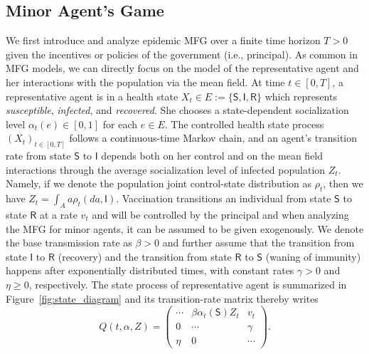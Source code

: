 \documentclass[letterpaper, 10 pt, conference]{ieeeconf}  %
\def\sS{\mathsf{S}}
\def\sI{\mathsf{I}}
\def\sR{\mathsf{R}}
\begin{document}
\subsection{Minor Agent's Game}
We first introduce and analyze epidemic MFG over a finite time horizon $T>0$ given the incentives or policies of the government (i.e., principal). As common in MFG models, we can directly focus on the model of the representative agent and her interactions with the population via the mean field. At time $t \in[0, T]$, a representative agent is in a health state $X_t \in E:=\{\sS, \sI, \sR\}$ which represents \textit{susceptible}, \textit{infected}, and \textit{recovered}. She chooses a state-dependent socialization level $\alpha_t(e) \in[0,1]$ for each $e \in E$. 
The controlled health state process $(X_t)_{t \in [0,T]}$ follows a continuous-time Markov chain, and an agent’s transition rate from state $\sS$ to $\sI$ depends both on her control and on the mean field interactions through the average socialization level of infected population $Z_t$. Namely, if we denote the population joint control-state distribution as $\rho_t$, then we have $Z_t = \int_A a \rho_t(d a, \sI)$. Vaccination transitions an individual from state $\sS$ to state $\sR$ at a rate $v_t$ and will be controlled by the principal and when analyzing the MFG for minor agents, it can be assumed to be given exogenously. We denote the base transmission rate as $\beta > 0$ and further assume that the transition from state $\sI$ to $\sR$ (recovery) and the transition from state $\sR$ to $\sS$ (waning of immunity) happens after exponentially distributed times, with constant rates $\gamma > 0$ and $\eta \geq 0$, respectively. The state process of representative agent is summarized in Figure~\ref{fig:state_diagram} and its transition-rate matrix thereby writes
$$Q(t,\alpha,Z)=\left(\begin{array}{ccc} \cdots & \beta \alpha_t(\sS) Z_t & v_t \\ 0 & \cdots & \gamma \\ \eta & 0 & \cdots\end{array}\right).$$
\end{document}
